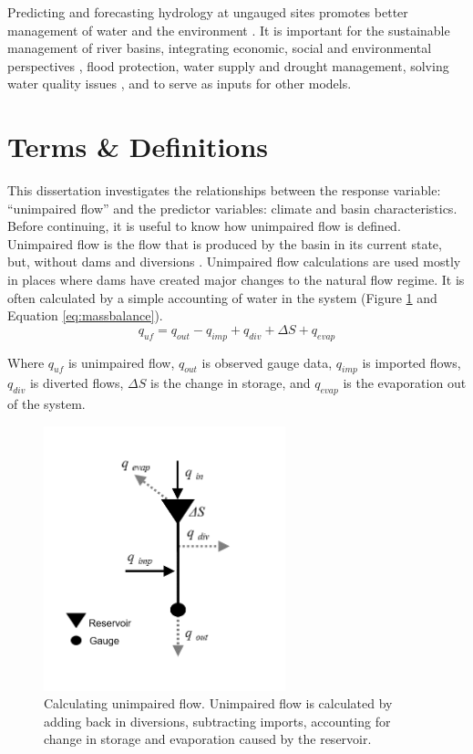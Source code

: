 Predicting and forecasting hydrology at ungauged sites promotes better management of water and the environment \cite{sivapalan2003iahs}. It is
important for the sustainable management of river basins, integrating economic, social and environmental perspectives \cite{sivapalan2003prediction}, flood protection, water supply and drought management, solving water quality issues \cite{hrachowitz2013decade}, and to serve as inputs for other models. 

\section{Terms \& Definitions}
This dissertation investigates the relationships between the response variable: ``unimpaired flow'' and the predictor variables: climate and basin characteristics. Before continuing, it is useful to know how unimpaired flow is defined. Unimpaired flow is the flow that is produced by the basin in its current state, but, without dams and diversions \cite{cadwruf2016}. Unimpaired flow calculations are used mostly in places where dams have created major changes to the natural flow regime. It is often calculated by a simple accounting of water in the system (Figure \ref{fig:unimpairedflow} and Equation \ref{eq:massbalance}).
\begin{equation}
	\label{eq:massbalance}
	q_{uf} = q_{out} - q_{imp} + q_{div} + \Delta S + q_{evap}
\end{equation}

Where $q_{uf}$ is unimpaired flow, $q_{out}$ is observed gauge data, $q_{imp}$ is imported flows, $q_{div}$ is diverted flows, $\Delta S$ is the change in storage, and $q_{evap}$ is the evaporation out of the system.  

\begin{figure}
	\centering
	\includegraphics[width=7cm,trim={0 1cm 0 1cm},clip=true]{plots/ch1_unimpaired_flow.png}
	\caption{Calculating unimpaired flow. Unimpaired flow is calculated by adding back in diversions, subtracting imports, accounting for change in storage and evaporation caused by the reservoir.} 
	\label{fig:unimpairedflow}
\end{figure}

